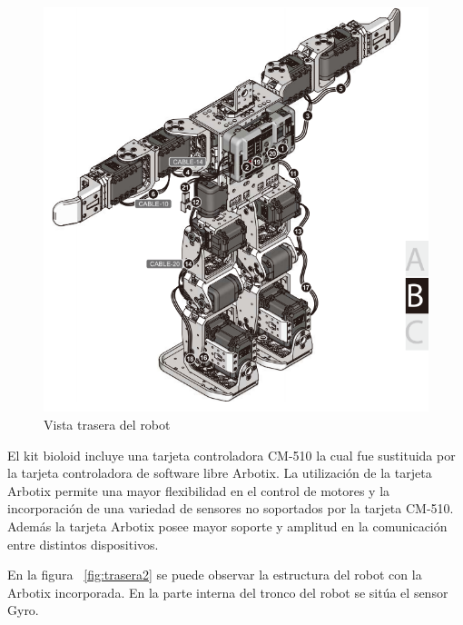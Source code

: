\begin{figure}[hbtp]
\centering
\includegraphics[scale=0.3]{imagenes/RobotTrasero.png}
\caption{Vista trasera del robot}
\label{fig:trasera1}
\end{figure}

El kit bioloid incluye una tarjeta controladora CM-510 la cual fue sustituida por la tarjeta controladora de software libre Arbotix. La utilización de la tarjeta Arbotix permite una mayor flexibilidad en el control de motores y la incorporación de una variedad de sensores no soportados por la tarjeta CM-510.
Además la tarjeta Arbotix posee mayor soporte y amplitud en la comunicación entre distintos dispositivos. 

En la figura ~\ref{fig:trasera2} se puede observar la estructura del robot con la Arbotix incorporada. En la parte interna del tronco del robot se sitúa el sensor Gyro.

